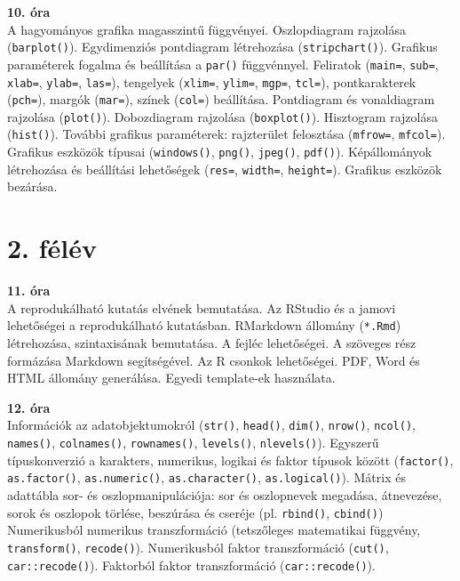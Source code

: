\documentclass[
]{book}
\begin{document}
\textbf{10. óra}\\
A hagyományos grafika magasszintű függvényei. Oszlopdiagram rajzolása (\texttt{barplot()}). Egydimenziós pontdiagram létrehozása (\texttt{stripchart()}). Grafikus paraméterek fogalma és beállítása a \texttt{par()} függvénnyel. Feliratok (\texttt{main=}, \texttt{sub=}, \texttt{xlab=}, \texttt{ylab=}, \texttt{las=}), tengelyek (\texttt{xlim=}, \texttt{ylim=}, \texttt{mgp=}, \texttt{tcl=}), pontkarakterek (\texttt{pch=}), margók (\texttt{mar=}), színek (\texttt{col=}) beállítása. Pontdiagram és vonaldiagram rajzolása (\texttt{plot()}). Dobozdiagram rajzolása (\texttt{boxplot()}). Hisztogram rajzolása (\texttt{hist()}). További grafikus paraméterek: rajzterület felosztása (\texttt{mfrow=}, \texttt{mfcol=}). Grafikus eszközök típusai (\texttt{windows()}, \texttt{png()}, \texttt{jpeg()}, \texttt{pdf()}). Képállományok létrehozása és beállítási lehetőségek (\texttt{res=}, \texttt{width=}, \texttt{height=}). Grafikus eszközök bezárása.

\hypertarget{felev-2}{%
\section*{2. félév}\label{felev-2}}

\textbf{11. óra}\\
A reprodukálható kutatás elvének bemutatása. Az RStudio és a jamovi lehetőségei a reprodukálható kutatásban. RMarkdown állomány (\texttt{*.Rmd}) létrehozása, szintaxisának bemutatása. A fejléc lehetőségei. A szöveges rész formázása Markdown segítségével. Az R csonkok lehetőségei. PDF, Word és HTML állomány generálása. Egyedi template-ek használata.

\textbf{12. óra}\\
Információk az adatobjektumokról (\texttt{str()}, \texttt{head()}, \texttt{dim()}, \texttt{nrow()}, \texttt{ncol()}, \texttt{names()}, \texttt{colnames()}, \texttt{rownames()}, \texttt{levels()}, \texttt{nlevels()}). Egyszerű típuskonverzió a karakters, numerikus, logikai és faktor típusok között (\texttt{factor()}, \texttt{as.factor()}, \texttt{as.numeric()}, \texttt{as.character()}, \texttt{as.logical()}). Mátrix és adattábla sor- és oszlopmanipulációja: sor és oszlopnevek megadása, átnevezése, sorok és oszlopok törlése, beszúrása és cseréje (pl. \texttt{rbind()}, \texttt{cbind()}) Numerikusból numerikus transzformáció (tetszőleges matematikai függvény, \texttt{transform()}, \texttt{recode()}). Numerikusból faktor transzformáció (\texttt{cut()}, \texttt{car::recode()}). Faktorból faktor transzformáció (\texttt{car::recode()}).
\end{document}
